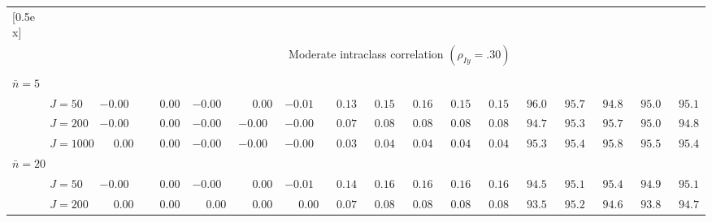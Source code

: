 \begin{sidewaystable}
\begin{threeparttable}
\begin{tabular}{llccccccccccccccc}
[0.5ex]\hline\\[-1.6ex] 
& & \multicolumn{15}{c}{Moderate intraclass correlation $(\rho_{Iy}=.30)$} \\[0.6ex]\hline\\[-1.8ex]
\multicolumn{4}{l}{$\bar{n}=5$} \\  & \nopagebreak $\;J=50$  & ${-}0.00\phantom{0}$ & $\phantom{-}0.00\phantom{0}$ & ${-}0.00\phantom{0}$ & $\phantom{-}0.00\phantom{0}$ & ${-}0.01\phantom{0}$ & $\phantom{0}0.13\phantom{0}$ & $\phantom{0}0.15\phantom{0}$ & $\phantom{0}0.16\phantom{0}$ & $\phantom{0}0.15\phantom{0}$ & $\phantom{0}0.15\phantom{0}$ & $\phantom{0}96.0\phantom{0}$ & $\phantom{0}95.7\phantom{0}$ & $\phantom{0}94.8\phantom{0}$ & $\phantom{0}95.0\phantom{0}$ & $\phantom{0}95.1\phantom{0}$ \\
 & \nopagebreak $\;J=200$  & ${-}0.00\phantom{0}$ & $\phantom{-}0.00\phantom{0}$ & ${-}0.00\phantom{0}$ & ${-}0.00\phantom{0}$ & ${-}0.00\phantom{0}$ & $\phantom{0}0.07\phantom{0}$ & $\phantom{0}0.08\phantom{0}$ & $\phantom{0}0.08\phantom{0}$ & $\phantom{0}0.08\phantom{0}$ & $\phantom{0}0.08\phantom{0}$ & $\phantom{0}94.7\phantom{0}$ & $\phantom{0}95.3\phantom{0}$ & $\phantom{0}95.7\phantom{0}$ & $\phantom{0}95.0\phantom{0}$ & $\phantom{0}94.8\phantom{0}$ \\
 & \nopagebreak $\;J=1000$  & $\phantom{-}0.00\phantom{0}$ & $\phantom{-}0.00\phantom{0}$ & ${-}0.00\phantom{0}$ & ${-}0.00\phantom{0}$ & ${-}0.00\phantom{0}$ & $\phantom{0}0.03\phantom{0}$ & $\phantom{0}0.04\phantom{0}$ & $\phantom{0}0.04\phantom{0}$ & $\phantom{0}0.04\phantom{0}$ & $\phantom{0}0.04\phantom{0}$ & $\phantom{0}95.3\phantom{0}$ & $\phantom{0}95.4\phantom{0}$ & $\phantom{0}95.8\phantom{0}$ & $\phantom{0}95.5\phantom{0}$ & $\phantom{0}95.4\phantom{0}$ \\
\multicolumn{4}{l}{$\bar{n}=20$} \\  & \nopagebreak $\;J=50$  & ${-}0.00\phantom{0}$ & $\phantom{-}0.00\phantom{0}$ & ${-}0.00\phantom{0}$ & $\phantom{-}0.00\phantom{0}$ & ${-}0.01\phantom{0}$ & $\phantom{0}0.14\phantom{0}$ & $\phantom{0}0.16\phantom{0}$ & $\phantom{0}0.16\phantom{0}$ & $\phantom{0}0.16\phantom{0}$ & $\phantom{0}0.16\phantom{0}$ & $\phantom{0}94.5\phantom{0}$ & $\phantom{0}95.1\phantom{0}$ & $\phantom{0}95.4\phantom{0}$ & $\phantom{0}94.9\phantom{0}$ & $\phantom{0}95.1\phantom{0}$ \\
 & \nopagebreak $\;J=200$  & $\phantom{-}0.00\phantom{0}$ & $\phantom{-}0.00\phantom{0}$ & $\phantom{-}0.00\phantom{0}$ & $\phantom{-}0.00\phantom{0}$ & $\phantom{-}0.00\phantom{0}$ & $\phantom{0}0.07\phantom{0}$ & $\phantom{0}0.08\phantom{0}$ & $\phantom{0}0.08\phantom{0}$ & $\phantom{0}0.08\phantom{0}$ & $\phantom{0}0.08\phantom{0}$ & $\phantom{0}93.5\phantom{0}$ & $\phantom{0}95.2\phantom{0}$ & $\phantom{0}94.6\phantom{0}$ & $\phantom{0}93.8\phantom{0}$ & $\phantom{0}94.7\phantom{0}$ \\

\end{tabular}
\end{threeparttable}
\end{sidewaystable}
